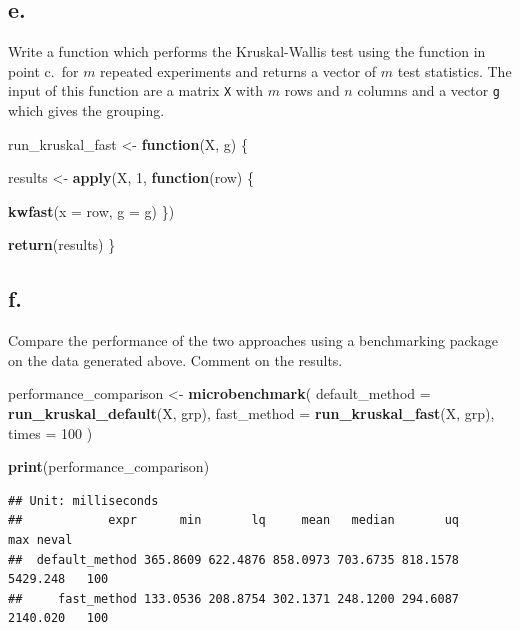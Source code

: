 \documentclass[
]{article}
\newenvironment{Shaded}{\begin{snugshade}}{\end{snugshade}}
\newcommand{\AttributeTok}[1]{\textcolor[rgb]{0.13,0.29,0.53}{#1}}
\newcommand{\ControlFlowTok}[1]{\textcolor[rgb]{0.13,0.29,0.53}{\textbf{#1}}}
\newcommand{\DecValTok}[1]{\textcolor[rgb]{0.00,0.00,0.81}{#1}}
\newcommand{\FunctionTok}[1]{\textcolor[rgb]{0.13,0.29,0.53}{\textbf{#1}}}
\newcommand{\NormalTok}[1]{#1}
\newcommand{\OtherTok}[1]{\textcolor[rgb]{0.56,0.35,0.01}{#1}}
\begin{document}
\subsection{e.}\label{e.-2}

Write a function which performs the Kruskal-Wallis test using the
function in point c.~for \(m\) repeated experiments and returns a vector
of \(m\) test statistics. The input of this function are a matrix
\texttt{X} with \(m\) rows and \(n\) columns and a vector \texttt{g}
which gives the grouping.

\begin{Shaded}
\begin{Highlighting}[]
\NormalTok{run\_kruskal\_fast }\OtherTok{\textless{}{-}} \ControlFlowTok{function}\NormalTok{(X, g) \{}
  
\NormalTok{  results }\OtherTok{\textless{}{-}} \FunctionTok{apply}\NormalTok{(X, }\DecValTok{1}\NormalTok{, }\ControlFlowTok{function}\NormalTok{(row) \{}
    
    \FunctionTok{kwfast}\NormalTok{(}\AttributeTok{x =}\NormalTok{ row, }\AttributeTok{g =}\NormalTok{ g)}
\NormalTok{  \})}
  
  \FunctionTok{return}\NormalTok{(results)}
\NormalTok{\}}
\end{Highlighting}
\end{Shaded}

\subsection{f.}\label{f.-1}

Compare the performance of the two approaches using a benchmarking
package on the data generated above. Comment on the results.

\begin{Shaded}
\begin{Highlighting}[]
\NormalTok{performance\_comparison }\OtherTok{\textless{}{-}} \FunctionTok{microbenchmark}\NormalTok{(}
  \AttributeTok{default\_method =} \FunctionTok{run\_kruskal\_default}\NormalTok{(X, grp),}
  \AttributeTok{fast\_method    =} \FunctionTok{run\_kruskal\_fast}\NormalTok{(X, grp),}
  \AttributeTok{times =} \DecValTok{100}
\NormalTok{)}

\FunctionTok{print}\NormalTok{(performance\_comparison)}
\end{Highlighting}
\end{Shaded}

\begin{verbatim}
## Unit: milliseconds
##            expr      min       lq     mean   median       uq      max neval
##  default_method 365.8609 622.4876 858.0973 703.6735 818.1578 5429.248   100
##     fast_method 133.0536 208.8754 302.1371 248.1200 294.6087 2140.020   100
\end{verbatim}
\end{document}
